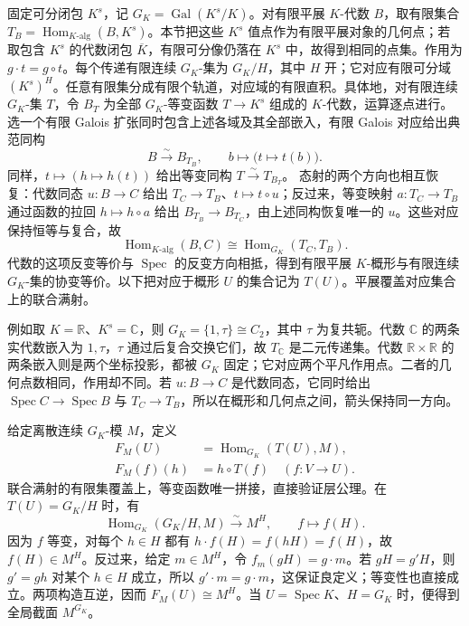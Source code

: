 \begin{proofsketch}
	固定可分闭包 \(K^s\)，记 \(G_K=\operatorname{Gal}(K^s/K)\)。对有限平展 \(K\)-代数 \(B\)，取有限集合 \(T_B=\operatorname{Hom}_{K\text{-}\mathrm{alg}}(B,K^s)\)。本节把这些 \(K^s\) 值点作为有限平展对象的几何点；若取包含 \(K^s\) 的代数闭包 \(\overline K\)，有限可分像仍落在 \(K^s\) 中，故得到相同的点集。作用为 \(g\cdot t=g\circ t\)。每个传递有限连续 \(G_K\)-集为 \(G_K/H\)，其中 \(H\) 开；它对应有限可分域 \((K^s)^H\)。任意有限集分成有限个轨道，对应域的有限直积。具体地，对有限连续 \(G_K\)-集 \(T\)，令 \(B_T\) 为全部 \(G_K\)-等变函数 \(T\to K^s\) 组成的 \(K\)-代数，运算逐点进行。选一个有限 Galois 扩张同时包含上述各域及其全部嵌入，有限 Galois 对应给出典范同构
	\[
		B\xrightarrow{\sim}B_{T_B},\qquad b\longmapsto\bigl(t\longmapsto t(b)\bigr).
	\]
	同样，\(t\mapsto(h\mapsto h(t))\) 给出等变同构 \(T\xrightarrow{\sim}T_{B_T}\)。 态射的两个方向也相互恢复：代数同态 \(u:B\to C\) 给出 \(T_C\to T_B\)、\(t\mapsto t\circ u\)；反过来，等变映射 \(a:T_C\to T_B\) 通过函数的拉回 \(h\mapsto h\circ a\) 给出 \(B_{T_B}\to B_{T_C}\)，由上述同构恢复唯一的 \(u\)。这些对应保持恒等与复合，故
	\[
		\operatorname{Hom}_{K\text{-}\mathrm{alg}}(B,C) \cong\operatorname{Hom}_{G_K}(T_C,T_B).
	\]
	代数的这项反变等价与 \(\operatorname{Spec}\) 的反变方向相抵，得到有限平展 \(K\)-概形与有限连续 \(G_K\)-集的协变等价。以下把对应于概形 \(U\) 的集合记为 \(T(U)\)。平展覆盖对应集合上的联合满射。

	例如取 \(K=\mathbb R\)、\(K^s=\mathbb C\)，则 \(G_K=\{1,\tau\}\cong C_2\)，其中 \(\tau\) 为复共轭。代数 \(\mathbb C\) 的两条实代数嵌入为 \(1,\tau\)，\(\tau\) 通过后复合交换它们，故 \(T_{\mathbb C}\) 是二元传递集。代数 \(\mathbb R\times\mathbb R\) 的两条嵌入则是两个坐标投影，都被 \(G_K\) 固定；它对应两个平凡作用点。二者的几何点数相同，作用却不同。若 \(u:B\to C\) 是代数同态，它同时给出 \(\operatorname{Spec}C\to\operatorname{Spec}B\) 与 \(T_C\to T_B\)，所以在概形和几何点之间，箭头保持同一方向。

	给定离散连续 \(G_K\)-模 \(M\)，定义
	\[
		\begin{aligned}
			F_M(U)&=\operatorname{Hom}_{G_K}(T(U),M),\\
			F_M(f)(h)&=h\circ T(f)\quad(f:V\to U).
		\end{aligned}
	\]
	联合满射的有限集覆盖上，等变函数唯一拼接，直接验证层公理。在 \(T(U)=G_K/H\) 时，有
	\[
		\operatorname{Hom}_{G_K}(G_K/H,M)\xrightarrow{\sim}M^H, \qquad f\longmapsto f(H).
	\]
	因为 \(f\) 等变，对每个 \(h\in H\) 都有 \(h\cdot f(H)=f(hH)=f(H)\)，故 \(f(H)\in M^H\)。反过来，给定 \(m\in M^H\)，令 \(f_m(gH)=g\cdot m\)。若 \(gH=g'H\)，则 \(g'=gh\) 对某个 \(h\in H\) 成立，所以 \(g'\cdot m=g\cdot m\)，这保证良定义；等变性也直接成立。两项构造互逆，因而 \(F_M(U)\cong M^H\)。当 \(U=\operatorname{Spec}K\)、\(H=G_K\) 时，便得到全局截面 \(M^{G_K}\)。


\end{proofsketch}

